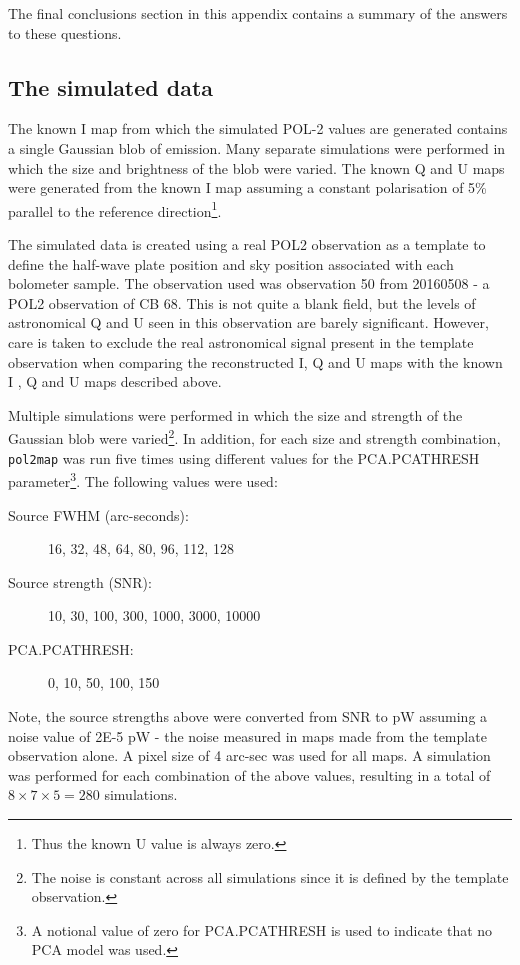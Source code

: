 \documentclass[twoside,11pt]{starlink}
\begin{document}
The final conclusions section in this appendix contains a summary of the
answers to these questions.

\subsection{The simulated data}
The known I map from which the simulated POL-2 values are generated contains
a single Gaussian blob of emission. Many separate simulations were
performed in which the size and brightness of the blob were varied. The
known Q and U maps were generated from the known I map assuming a
constant polarisation of 5\% parallel to the reference
direction\footnote{Thus the known U value is always zero.}.

The simulated data is created using a real POL2 observation as a template
to define the half-wave plate position and sky position associated with
each bolometer sample. The observation used was observation 50 from
20160508 - a POL2 observation of CB 68. This is not quite  a blank field,
but the levels of astronomical Q and U seen in this observation are
barely significant. However, care is taken to exclude the real astronomical
signal present in the template observation when comparing the
reconstructed I, Q and U maps with the known I , Q and U maps described
above.

Multiple simulations were performed in which the size and strength of the
Gaussian blob were varied\footnote{The noise is constant across all
simulations since it is defined by the template observation.}. In addition,
for each size and strength
combination, \texttt{pol2map} was run five times using different values
for the PCA.PCATHRESH parameter\footnote{A notional value of zero for PCA.PCATHRESH
is used to indicate that no PCA model was used.}. The following values were used:

\begin{description}
\item[Source FWHM (arc-seconds):] 16, 32, 48, 64, 80, 96, 112, 128
\item[Source strength (SNR):] 10, 30, 100, 300, 1000, 3000, 10000
\item[PCA.PCATHRESH:] 0, 10, 50, 100, 150
\end{description}

Note, the source strengths above were converted from SNR to pW assuming a
noise value of 2E-5 pW - the noise measured in maps made from the
template observation alone. A pixel size of 4 arc-sec was used for all
maps. A simulation was performed for each combination of the above values,
resulting in a total of $8\times7\times5 = 280$ simulations.
\end{document}
